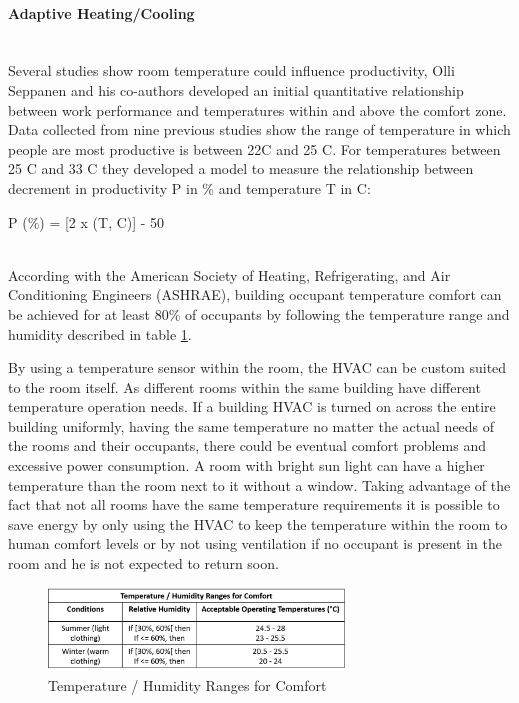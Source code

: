 \paragraph{Adaptive Heating/Cooling}\label{related:adaptive_heating}\mbox{}\\


Several studies show room temperature could influence productivity, Olli Seppanen and his co-authors developed an initial quantitative relationship between work performance and temperatures within and above the comfort zone\cite{temperature_survey}. Data collected from nine previous studies show the range of temperature in which people are most productive is between 22C and 25 C. For temperatures between 25 C and 33 C they developed a model to measure the relationship between decrement in productivity P in \% and
temperature T in  C: 

P (\%) = [2 x (T, C)] - 50 


\mbox{}\\
According with the American Society of Heating, Refrigerating, and Air Conditioning Engineers (ASHRAE), building occupant temperature comfort can be achieved for at least 80\% of occupants\cite{std_ASHRAE_55} by following the temperature range and humidity described in table \ref{tab_temperature}.

 
By using a temperature sensor within the room, the HVAC can be custom suited to the room itself. As different rooms within the same building have different temperature operation needs. If a building HVAC is turned on across the entire building uniformly, having the same temperature no matter the actual needs of the rooms and their occupants, there could be eventual comfort problems and excessive power consumption. A room with bright sun light can have a higher temperature than the room next to it without a window. Taking advantage of the fact that not all rooms have the same temperature requirements it is possible to save energy by only using the HVAC to keep the temperature within the room to human comfort levels or by not using ventilation if no occupant is present in the room and he is not expected to return soon.




\begin{figure}[h]
\centering
\includegraphics[width=0.7\textwidth]{Figures/tabela_temperatura}
\caption{Temperature / Humidity Ranges for Comfort}
\label{tab_temperature}
\end{figure}



